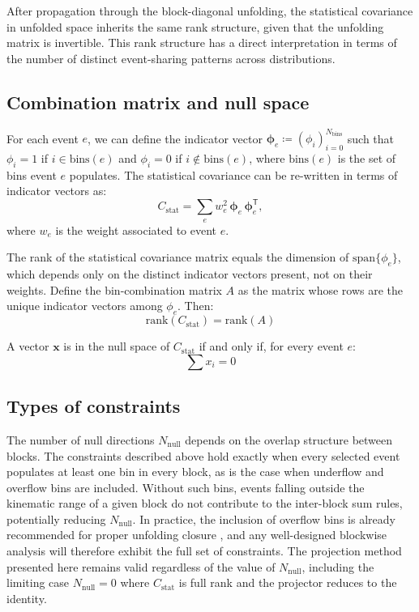 \documentclass[aps,prd,twocolumn,showpacs,superscriptaddress,floatfix]{revtex4-2}
\begin{document}
After propagation through the block-diagonal unfolding, the statistical covariance in unfolded space inherits the same rank structure, given that the unfolding matrix is invertible. This rank structure has a direct interpretation in terms of the number of distinct event-sharing patterns across distributions.

\subsection{Combination matrix and null space}

For each event $e$, we can define the indicator vector $\bm{\phi}_{e} \coloneqq (\phi_{i})_{i = 0}^{N_{\text{bins}}}$ such that $\phi_{i} = 1$ if $i \in \text{bins}(e)$ and $\phi_{i} = 0$ if $i \notin \text{bins}(e)$, where $\text{bins}(e)$ is the set of bins event $e$ populates. The statistical covariance can be re-written in terms of indicator vectors as:
\begin{equation}
    C_{\text{stat}} = \sum_{e} w_{e}^{2} \, \bm{\phi}_{e} \, \bm{\phi}_{e}^{\mathsf{T}},
\end{equation}
where $w_{e}$ is the weight associated to event $e$.

The rank of the statistical covariance matrix equals the dimension of $\mathrm{span}\{\phi_e\}$, which depends only on the distinct indicator vectors present, not on their weights. Define the bin-combination matrix $A$ as the matrix whose rows are the unique indicator vectors among $\phi_e$. Then:
\begin{equation}
    \mathrm{rank} (C_{\text{stat}}) = \mathrm{rank} (A)
\end{equation}

A vector $\mathbf{x}$ is in the null space of $C_{\text{stat}}$ if and only if, for every event $e$:
\begin{equation}
    \sum x_{i} = 0
\end{equation}

\subsection{Types of constraints}

The number of null directions $N_\text{null}$ depends on the overlap structure between blocks. The constraints described above hold exactly when every selected event populates at least one bin in every block, as is the case when underflow and overflow bins are included. Without such bins, events falling outside the kinematic range of a given block do not contribute to the inter-block sum rules, potentially reducing $N_\text{null}$. In practice, the inclusion of overflow bins is already recommended for proper unfolding closure \cite{Gardiner:2024gdy}, and any well-designed blockwise analysis will therefore exhibit the full set of constraints. The projection method presented here remains valid regardless of the value of $N_\text{null}$, including the limiting case $N_\text{null} = 0$ where $C_\text{stat}$ is full rank and the projector reduces to the identity.
\end{document}
